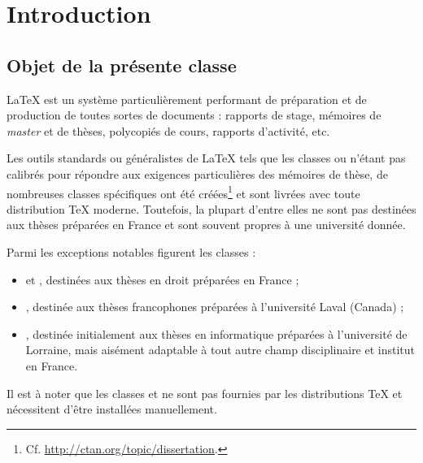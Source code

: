 \chapter{Introduction}

\section{Objet de la présente classe}
\label{sec-objet-de-la}

\LaTeX{} est un système particulièrement performant de préparation et de
production de toutes sortes de documents : rapports de stage, mémoires de
\emph{master} et de thèses, polycopiés de cours, rapports d'activité, etc.

Les outils standards ou généralistes de \LaTeX{} tels que les classes
 ou  n'étant pas calibrés pour répondre aux exigences
particulières des mémoires de thèse, de nombreuses classes spécifiques ont été
créées\footnote{Cf. \url{http://ctan.org/topic/dissertation}.}  et sont livrées
avec toute distribution \TeX{} moderne. Toutefois, la plupart d'entre elles ne
sont pas destinées aux thèses préparées en France et sont souvent propres à une
université donnée.

Parmi les exceptions notables figurent les classes :
\begin{itemize}
\item {} et
  , destinées aux
thèses en droit préparées en France ;
\item {}, destinée aux thèses francophones préparées à l'université
  Laval (Canada) ;
\item {}, destinée
  initialement aux thèses en informatique préparées à l'université de Lorraine,
  mais aisément adaptable à tout autre champ disciplinaire et institut en
  France.
\end{itemize}
Il est à noter que les classes  et  ne sont pas
fournies par les distributions \TeX{} et nécessitent d'être installées
manuellement.

\frenchabstract{}


